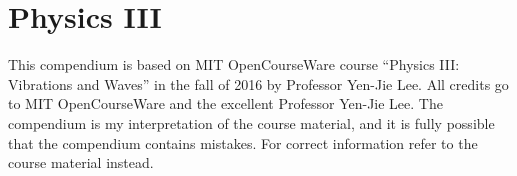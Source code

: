 \chapter{Physics III}
This compendium is based on MIT OpenCourseWare course ``Physics III: Vibrations and Waves'' in the fall of 2016 by Professor Yen-Jie Lee. All credits go to MIT OpenCourseWare and the excellent Professor Yen-Jie Lee.
The compendium is my interpretation of the course material, and it is fully possible that the compendium contains mistakes. For correct information refer to the course material instead.
